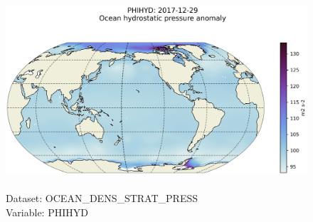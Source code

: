 \begin{figure}[H]
\centering
\includegraphics[scale=0.5]{../images/plots/latlon_plots/Ocean_Density_Stratification_and_Hydrostatic_Pressure/PHIHYD.png}
\caption{\\Dataset: OCEAN\_DENS\_STRAT\_PRESS\\Variable: PHIHYD}
\label{tab:table-OCEAN_DENS_STRAT_PRESS_PHIHYD-Plot}
\end{figure}
\pagebreak
